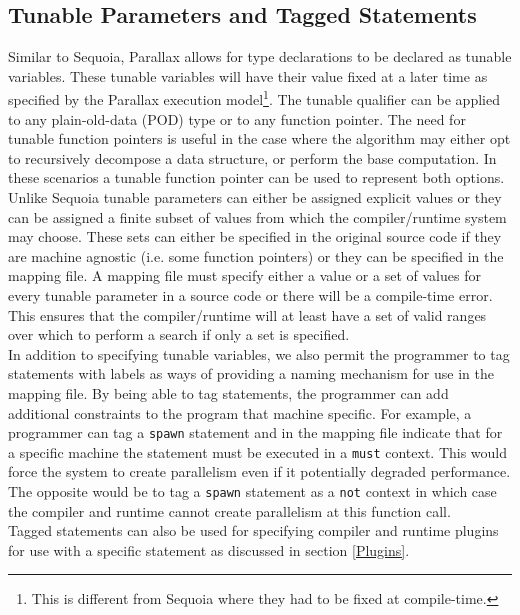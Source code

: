 \documentclass{article}
\theoremstyle{definition}
\begin{document}
\subsection{Tunable Parameters and Tagged Statements \label{Tunables}}
\noindent
Similar to Sequoia, Parallax allows for type declarations to be declared as
tunable variables.  These tunable variables will have their value fixed at 
a later time as specified by the Parallax execution model\footnote{This is different from
Sequoia where they had to be fixed at compile-time.}.  The tunable qualifier
can be applied to any plain-old-data (POD) type or to any function pointer.
The need for tunable function pointers is useful in the case where the algorithm
may either opt to recursively decompose a data structure, or perform the base computation.
In these scenarios a tunable function pointer can be used to represent both options. \\

\noindent
Unlike Sequoia tunable parameters can either be assigned explicit values or they
can be assigned a finite subset of values from which the compiler/runtime system
may choose.  These sets can either be specified in the original source code if they
are machine agnostic (i.e. some function pointers) or they can be specified in the
mapping file.  A mapping file must specify either a value or a set of values for every
tunable parameter in a source code or there will be a compile-time error.  This
ensures that the compiler/runtime will at least have a set of valid ranges over which
to perform a search if only a set is specified.\\

\noindent
In addition to specifying tunable variables, we also permit the programmer to tag
statements with labels as ways of providing a naming mechanism for use in the mapping
file.  By being able to tag statements, the programmer can add additional constraints
to the program that machine specific.  For example, a programmer can tag a {\tt spawn}
statement and in the mapping file indicate that for a specific machine the statement
must be executed in a {\tt must} context.  This would force the system to create
parallelism even if it potentially degraded performance.  The opposite would be to
tag a {\tt spawn} statement as a {\tt not} context in which case the compiler and 
runtime cannot create parallelism at this function call. \\

\noindent 
Tagged statements can also be used for specifying compiler and runtime plugins for
use with a specific statement as discussed in section \ref{Plugins}.
\end{document}
